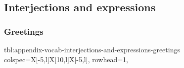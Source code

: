 \documentclass[../nihongo-gakushuu-kyouzai.tex]{subfiles}
\begin{document}
\appendix
\setcounter{section}{2}
\setcounter{subsection}{0}

\subsection{Interjections and expressions}

\subsubsection{Greetings}
{tbl:appendix-vocab-interjections-and-expressions-greetings}  %
{
    colspec={X[-5,l]X[10,l]X[-5,l]},
    rowhead=1,
}  %
\end{document}
